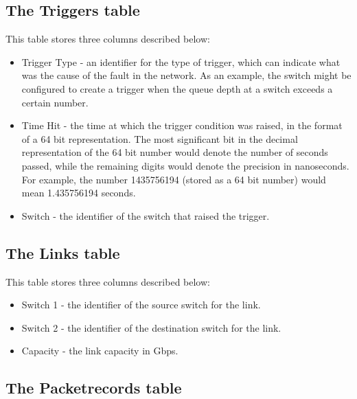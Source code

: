 \subsection{The Triggers table}

This table stores three columns described below:
\begin{itemize}
	\item Trigger Type - an identifier for the type of trigger, which can indicate what was
	the cause of the fault in the network. As an example, the switch might be configured to 
	create a trigger when the queue depth at a switch exceeds a certain number.
	\item Time Hit - the time at which the trigger condition was raised, 
	in the format of a 64 bit representation. The most significant bit in the decimal representation of the 64
	bit number would denote the number of seconds passed, while the remaining digits would denote the precision in nanoseconds.
	For example, the number 1435756194 (stored as a 64 bit number) would mean 1.435756194 seconds.
	\item Switch - the identifier of the switch that raised the trigger.
\end{itemize}

\subsection{The Links table}

This table stores three columns described below:
\begin{itemize}
	\item Switch 1 - the identifier of the source switch for the link.
	\item Switch 2 - the identifier of the destination switch for the link.
	\item Capacity - the link capacity in Gbps.
\end{itemize}

\subsection{The Packetrecords table}


